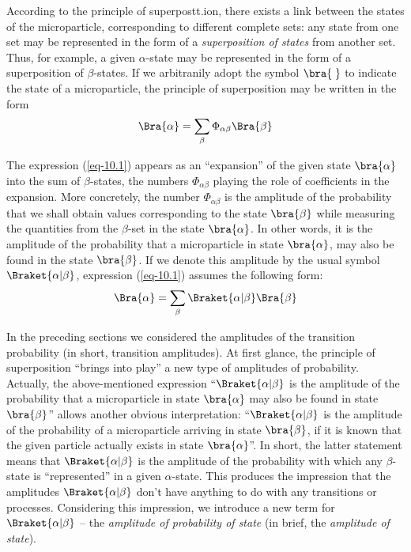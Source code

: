 \documentclass[a4paper,sfsidenotes,colorlinks=true]{tufte-book}
\numberwithin{equation}{section}
\numberwithin{figure}{section}
\begin{document}
According to the principle of superpostt.ion, there exists a link
between the states of the microparticle, corresponding to different
complete sets: any state from one set may be represented in the form
of a \emph{superposition of states} from another set. Thus, for example, a
given $\alpha$-state may be represented in the form of a superposition of
$\beta$-states. If we arbitranily adopt the symbol $\bra{\;} $ to indicate the state
of a microparticle, the principle of superposition may be written in
the form 
\begin{equation}%
\Bra{\alpha} = \sum_{\beta} \Phi_{\alpha \beta} \Bra{\beta }
\label{eq-10.1}
\end{equation}

The expression (\ref{eq-10.1}) appears as an ``expansion'' of the
given state $\bra{\alpha}$ into the sum of $\beta$-states, the numbers
$ \Phi_{\alpha \beta}$ playing the role of coefficients in the
expansion. More concretely, the number $\Phi_{\alpha \beta}$ is the
amplitude of the probability that we shall obtain values corresponding
to the state $\bra{\beta}$ while measuring the quantities from the
$\beta$-set in the state $\bra{\alpha}$. In other words, it is the
amplitude of the probability that a microparticle in state $\bra{\alpha}$, may
also be found in the state $\bra{\beta}$. If we denote this amplitude by the
usual symbol $\Braket{\alpha|\beta}$, expression (\ref{eq-10.1})
assumes the following form:
\begin{equation}%
\Bra{\alpha} = \sum_{\beta} \Braket{\alpha |\beta} \Bra{\beta }
\label{eq-10.2}
\end{equation}

In the preceding sections we considered the amplitudes of the
transition probability (in short, transition amplitudes). At first
glance, the principle of superposition ``brings into play'' a new type
of amplitudes of probability. Actually, the above-mentioned expression
``$\Braket{\alpha | \beta}$ is the amplitude of the probability that a
microparticle in state $\bra{\alpha}$ may also be found in state
$\bra{\beta}$'' allows another obvious interpretation:
``$\Braket{\alpha | \beta}$ is the amplitude of the probability of a
microparticle arriving in state $\bra{\beta}$, if it is known that the
given particle actually exists in state $\bra{\alpha}$''. In short,
the latter statement means that $\Braket{\alpha | \beta}$ is the
amplitude of the probability with which any $\beta$-state is
``represented'' in a given $\alpha$-state. This produces the
impression that the amplitudes $\Braket{\alpha | \beta}$ don't have
anything to do with any transitions or processes. Considering this
impression, we introduce a new term for $\Braket{\alpha | \beta}$ --
the \emph{amplitude of probability of state} (in brief, the
\emph{amplitude of state}).
\end{document}
